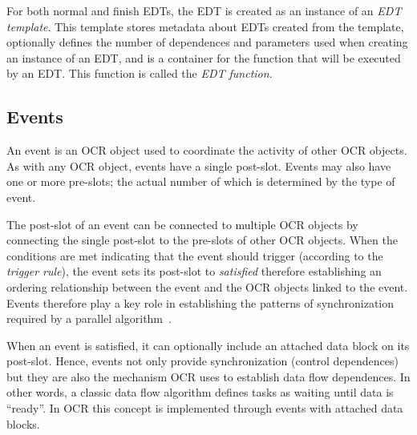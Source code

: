 For both normal and finish EDTs, the EDT is created as an
instance of an \emph{EDT template}. This template stores metadata about EDTs created from the
template, optionally defines the number of dependences and parameters
used when creating an instance of an EDT, and is a container for the
function that will be executed by an EDT. This function is called the
\emph{EDT function}.
\subsection{Events}
\label{sec:Event}
An event is an OCR object used to coordinate the activity of other OCR
objects. As with any OCR object, events have a single
post-slot. Events may also have one or more pre-slots; the actual
number of which is determined by the type of event.

The post-slot of an event can be connected to multiple OCR objects by
connecting the single post-slot to the pre-slots of other OCR objects.
When the conditions are met indicating that the event should trigger
(according to the \emph{trigger rule}), the event
sets its post-slot to \emph{satisfied} therefore establishing an
ordering relationship between the event and the OCR objects linked to
the event. Events therefore play a key role in establishing the
patterns of synchronization required by a parallel
algorithm~\cite{ImSa14-2}.

When an event is satisfied, it can optionally include an attached
data block on its post-slot. Hence, events not only provide synchronization
(control dependences) but they are also the mechanism OCR uses to
establish data flow dependences. In other words, a classic data flow
algorithm defines tasks as waiting until data is ``ready''. In OCR
this concept is implemented through events with attached data blocks.


